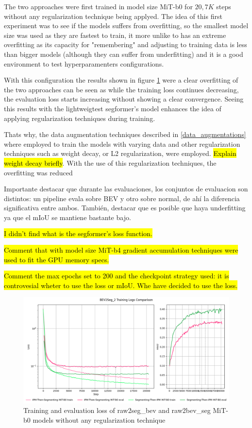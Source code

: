The two approaches were first trained in model size MiT-b0 for $20,7K$ steps without any regularization technique being applyed. The idea of this first experiment was to see if the models suffers from overfitting, so the smallest model size was used as they are fastest to train, it more unlike to has an extreme overfitting as its capacity for "remembering" and adjusting to training data is less than bigger models (although they can suffer from underfitting) and it is a good environment to test hyperparamenters configurations.


With this configuration the results shown in figure \ref{fig:overfitting_mit-b0} were a clear overfitting of the two approaches can be seen as while the training loss continues decreasing, the evaluation loss starts increasing without showing a clear convergence. Seeing this results with the lightweigtest segformer's model enhances the idea of applying regularization techniques during training. 

Thats why, the data augmentation techniques described in \ref{data_augmentations} where employed to train the models with varying data and other regularization techniques such as weight decay, or L2 regularization, were employed. \hl{Explain weight decay briefly}. With the use of this regularization techniques, the overfitting was reduced


Importante destacar que durante las evaluaciones, los conjuntos de evaluacion son distintos: un pipeline evala sobre BEV y otro sobre normal, de ahí la diferencia significativa entre ambos. También, destacar que es posible que haya underfitting ya que el mIoU se mantiene bastante bajo.


\hl{I didn't find what is the segformer's loss function.}

\hl{Comment that with model size MiT-b4 gradient accumulation techniques were used to fit the GPU memory specs.}

\hl{Comment the max epochs set to 200 and the checkpoint strategy used: it is controvesial wheter to use the loss or mIoU. Whe have decided to use the loss.}



\begin{figure}[h!]
    \centering
    \includegraphics[width=\linewidth]{./images/experiments/overfitting_bev_nu.png}
    \caption{Training and evaluation loss of raw2seg\_bev and raw2bev\_seg MiT-b0 models without any regularization technique}
    \label{fig:overfitting_mit-b0}
\end{figure}



